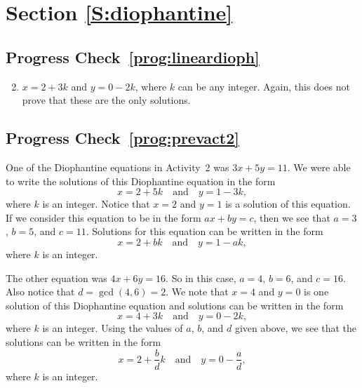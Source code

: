 \section*{Section \ref{S:diophantine}}
\subsection*{Progress Check~\ref{prog:lineardioph}}
\begin{enumerate} \setcounter{enumi}{1}
\item $x = 2 + 3k$ \quad and \quad $y = 0 - 2k$,
where $k$ can be any integer.  Again, this does not prove that these are the only solutions.
\end{enumerate}


\subsection*{Progress Check~\ref{prog:prevact2}}
One of the Diophantine equations in \typeu Activity~2 was $3x + 5y = 11$.  We were able to write the solutions of this Diophantine equation in the form
\[
x = 2 + 5k \quad \text{and} \quad y = 1 - 3k,
\]
where $k$ is an integer.  Notice that $x = 2$ and $y = 1$ is a solution of this equation.  If we consider this equation to be in the form $ax + by = c$, then we see that $a = 3$, $b = 5$, and 
$c = 11$.  Solutions for this equation can be written in the form
\[
x = 2 + bk \quad \text{and} \quad y = 1 - ak,
\]
where $k$ is an integer.

The other equation was $4x + 6y = 16$.  So in this case, $a = 4$, $b = 6$, and $c = 16$.  Also notice that $d = \gcd ( 4, 6 ) = 2$.  We note that $x = 4$ and $y = 0$ is one solution of this Diophantine equation and solutions can be written in the form
\[
x = 4 + 3k \quad \text{and} \quad y = 0 - 2k,
\]
where $k$ is an integer.  Using the values of $a$, $b$, and $d$ given above, we see that the solutions can be written in the form
\[
x = 2 + \frac{b}{d} k \quad \text{and} \quad y = 0 - \frac{a}{d},
\]
where $k$ is an integer. 


